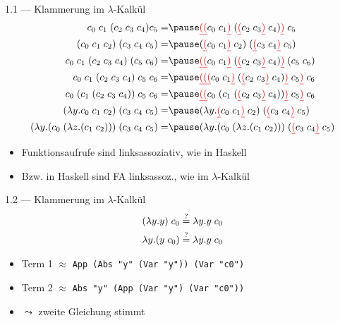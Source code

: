 \documentclass{beamer}
\begin{document}
\begin{frame}{1.1 --- Klammerung im $\lambda$-Kalkül}
	\footnotesize
	\begin{eqnarray}
		\liiin{c_0}{c_1}{\liii{c_2}{c_3}{c_4}}{c_5}                   =& \pause \liin{\liir{\liir{c_0}{c_1}}{\lii{\liir{c_2}{c_3}}{c_4}}}{c_5}             \\
		\liin{\liii{c_0}{c_1}{c_2}}{\liii{c_3}{c_4}{c_5}}             =& \pause \liin{\lii{\liir{c_0}{c_1}}{c_2}}{\lii{\liir{c_3}{c_4}}{c_5}}              \\
		\livn{c_0}{c_1}{\liii{c_2}{c_3}{c_4}}{\lii{c_5}{c_6}}         =& \pause \liin{\liir{\liir{c_0}{c_1}}{\lii{\liir{c_2}{c_3}}{c_4}}}{\lii{c_5}{c_6}}  \\
		\lvn{c_0}{c_1}{\liii{c_2}{c_3}{c_4}}{c_5}{c_6}                =& \pause \liin{\liir{\liir{\liir{c_0}{c_1}}{\lii{\liir{c_2}{c_3}}{c_4}}}{c_5}}{c_6} \\
		\livn{c_0}{\lii{c_1}{\liii{c_2}{c_3}{c_4}}}{c_5}{c_6}         =& \pause \liin{\liir{\liir{c_0}{\lii{c_1}{\lii{\liir{c_2}{c_3}}{c_4}}}}{c_5}}{c_6}  \\
		\liin{(\abs{y}{\liiin{c_0}{c_1}{c_2}})}{\liii{c_3}{c_4}{c_5}} =& \pause \liin{(\abs{y}{\liin{\liir{c_0}{c_1}}{c_2}})}{\lii{\liir{c_3}{c_4}}{c_5}}  \\
		\liin{(\abs{y}{\lii{c_0}{(\abs{z}{\lii{c_1}{c_2}})}}}{\liii{c_3}{c_4}{c_5}} =& \pause \liin{(\abs{y}{\lii{c_0}{(\abs{z}{\lii{c_1}{c_2}})}}}{\lii{\liir{c_3}{c_4}}{c_5}}
	\end{eqnarray}

	\normalsize
	\begin{itemize}
		\item Funktionsaufrufe sind linksassoziativ, wie in Haskell
		\item Bzw. in Haskell sind FA linksassoz., wie im $\lambda$-Kalkül
	\end{itemize}
\end{frame}

\setcounter{equation}{0}

\begin{frame}{1.2 --- Klammerung im $\lambda$-Kalkül}
	\begin{eqnarray}
		(\lambda{}y.y)\;{}c_0 \stackrel{?}{=} \lambda{}y.y\;{}c_0 \\
		\lambda{}y.(y\;{}c_0) \stackrel{?}{=} \lambda{}y.y\;{}c_0
	\end{eqnarray}

	\begin{itemize}
		\item Term 1 $\approx$ \texttt{App (Abs "y" (Var "y")) (Var "c0")}
		\item Term 2 $\approx$ \texttt{Abs "y" (App (Var "y") (Var "c0"))}
		\pause
		\item $\leadsto$ zweite Gleichung stimmt
	\end{itemize}
\end{frame}
\end{document}

